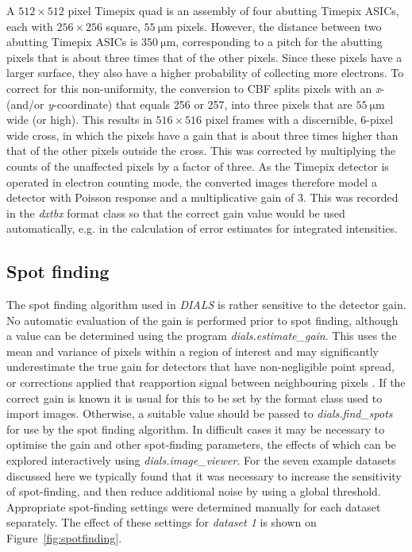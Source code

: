 \documentclass[preprint]{iucr}
\newcommand{\dxtbx}{\emph{dxtbx}\xspace}
\newcommand{\dials}{\emph{DIALS}\xspace}
\newcommand{\dialsestimategain}{\emph{dials.estimate\_gain}\xspace}
\newcommand{\dialsfindspots}{\emph{dials.find\_spots}\xspace}
\newcommand{\dialsimageviewer}{\emph{dials.image\_viewer}\xspace}
\begin{document}
A $512\times512$ pixel Timepix quad is an assembly of four abutting Timepix ASICs,
each with $256\times256$ square, $\SI{55}{\micro\metre}$ pixels. However, the distance
between two abutting Timepix ASICs is $\SI{350}{\micro\metre}$, corresponding
to a pitch for the abutting pixels that is about three times that of the other
pixels. Since these pixels have a larger surface, they also have a higher probability
of collecting more electrons. To correct for this non-uniformity, the conversion to
CBF splits pixels with an \emph{x}- (and/or \emph{y}-coordinate) that equals 256 or 257, into three
pixels that are $\SI{55}{\micro\metre}$ wide (or high). This results in $516\times516$ pixel
frames with a discernible, 6-pixel wide cross, in which the pixels have a gain that
is about three times higher than that of the other pixels outside the cross. This was
corrected by multiplying the counts of the unaffected pixels by a factor of three.
As the Timepix detector is operated in electron counting mode, the
converted images therefore model a detector with Poisson response and a
multiplicative gain of 3. This was recorded in the
\dxtbx format class so that the correct gain value would be used automatically, e.g.
in the calculation of error estimates for integrated intensities.

\subsection{Spot finding \label{sec:spot_finding}}

The spot finding algorithm used in \dials is rather sensitive to the detector
gain. No automatic evaluation of the gain is performed prior to spot finding,
although a value can be determined using the program \dialsestimategain. This
uses the mean and variance of pixels within a region of interest
\cite{leslie2006integration} and may significantly underestimate the true gain
for detectors that have non-negligible point spread, or corrections applied
that reapportion signal between neighbouring pixels \cite{Waterman2010}. If the
correct gain is known it is usual for this to be set by the format class used
to import images. Otherwise, a suitable value should be passed to
\dialsfindspots for use by the spot finding algorithm. In difficult cases it
may be necessary to optimise the gain and other spot-finding parameters, the
effects of which can be explored interactively using \dialsimageviewer. For the
seven example datasets discussed here we typically found that it was necessary
to increase the sensitivity of spot-finding, and then reduce additional noise
by using a global threshold. Appropriate spot-finding settings were determined
manually for each dataset separately. The effect of these settings for
\emph{dataset 1} is shown on Figure~\ref{fig:spotfinding}.
\end{document}
